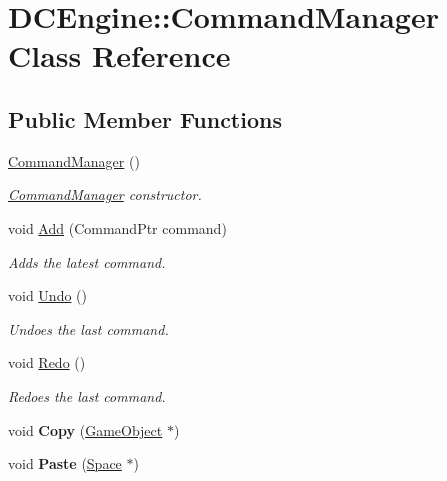 \hypertarget{classDCEngine_1_1CommandManager}{\section{D\-C\-Engine\-:\-:Command\-Manager Class Reference}
\label{classDCEngine_1_1CommandManager}
}
\subsection*{Public Member Functions}
\begin{DoxyCompactItemize}
\item 
\hypertarget{classDCEngine_1_1CommandManager_ad3b0f61d5c1a06107f77d04b1b33d5a2}{\hyperlink{classDCEngine_1_1CommandManager_ad3b0f61d5c1a06107f77d04b1b33d5a2}{Command\-Manager} ()}\label{classDCEngine_1_1CommandManager_ad3b0f61d5c1a06107f77d04b1b33d5a2}

\begin{DoxyCompactList}\small\item\em \hyperlink{classDCEngine_1_1CommandManager}{Command\-Manager} constructor. \end{DoxyCompactList}\item 
void \hyperlink{classDCEngine_1_1CommandManager_a46efd76d37bc0754ec51aa835a810863}{Add} (Command\-Ptr command)
\begin{DoxyCompactList}\small\item\em Adds the latest command. \end{DoxyCompactList}\item 
\hypertarget{classDCEngine_1_1CommandManager_a67d0955255042f2185788896503da1ef}{void \hyperlink{classDCEngine_1_1CommandManager_a67d0955255042f2185788896503da1ef}{Undo} ()}\label{classDCEngine_1_1CommandManager_a67d0955255042f2185788896503da1ef}

\begin{DoxyCompactList}\small\item\em Undoes the last command. \end{DoxyCompactList}\item 
\hypertarget{classDCEngine_1_1CommandManager_afc5a4b8a89b9472bd2359cb023adc60a}{void \hyperlink{classDCEngine_1_1CommandManager_afc5a4b8a89b9472bd2359cb023adc60a}{Redo} ()}\label{classDCEngine_1_1CommandManager_afc5a4b8a89b9472bd2359cb023adc60a}

\begin{DoxyCompactList}\small\item\em Redoes the last command. \end{DoxyCompactList}\item 
\hypertarget{classDCEngine_1_1CommandManager_a16405d660e327349e83a43d7624e9424}{void {\bfseries Copy} (\hyperlink{classDCEngine_1_1GameObject}{Game\-Object} $\ast$)}\label{classDCEngine_1_1CommandManager_a16405d660e327349e83a43d7624e9424}

\item 
\hypertarget{classDCEngine_1_1CommandManager_ac9dfe330808b732d110001c243f7df78}{void {\bfseries Paste} (\hyperlink{classDCEngine_1_1Space}{Space} $\ast$)}\label{classDCEngine_1_1CommandManager_ac9dfe330808b732d110001c243f7df78}

\end{DoxyCompactItemize}
